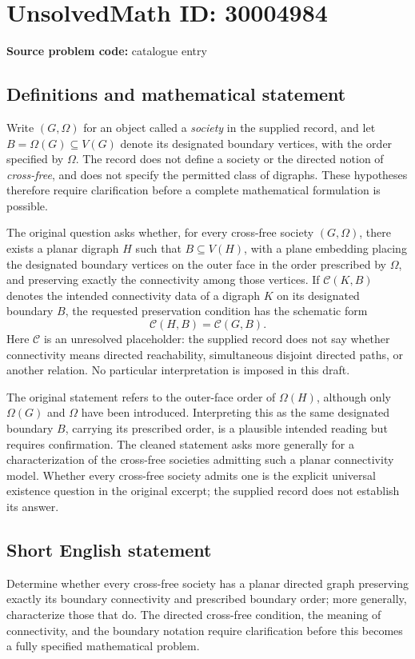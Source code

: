 \documentclass[11pt]{article}
\begin{document}
\section*{UnsolvedMath ID: 30004984}
\textbf{Source problem code:} catalogue entry
\subsection{Definitions and mathematical statement}
Write \((G,\Omega)\) for an object called a \emph{society} in the supplied record, and let \(B=\Omega(G)\subseteq V(G)\) denote its designated boundary vertices, with the order specified by \(\Omega\). The record does not define a society or the directed notion of \emph{cross-free}, and does not specify the permitted class of digraphs. These hypotheses therefore require clarification before a complete mathematical formulation is possible.

The original question asks whether, for every cross-free society \((G,\Omega)\), there exists a planar digraph \(H\) such that \(B\subseteq V(H)\), with a plane embedding placing the designated boundary vertices on the outer face in the order prescribed by \(\Omega\), and preserving exactly the connectivity among those vertices. If \(\mathcal C(K,B)\) denotes the intended connectivity data of a digraph \(K\) on its designated boundary \(B\), the requested preservation condition has the schematic form
\[
\mathcal C(H,B)=\mathcal C(G,B).
\]
Here \(\mathcal C\) is an unresolved placeholder: the supplied record does not say whether connectivity means directed reachability, simultaneous disjoint directed paths, or another relation. No particular interpretation is imposed in this draft.

The original statement refers to the outer-face order of \(\Omega(H)\), although only \(\Omega(G)\) and \(\Omega\) have been introduced. Interpreting this as the same designated boundary \(B\), carrying its prescribed order, is a plausible intended reading but requires confirmation. The cleaned statement asks more generally for a characterization of the cross-free societies admitting such a planar connectivity model. Whether every cross-free society admits one is the explicit universal existence question in the original excerpt; the supplied record does not establish its answer.
\subsection{Short English statement}
Determine whether every cross-free society has a planar directed graph preserving exactly its boundary connectivity and prescribed boundary order; more generally, characterize those that do. The directed cross-free condition, the meaning of connectivity, and the boundary notation require clarification before this becomes a fully specified mathematical problem.
\end{document}
